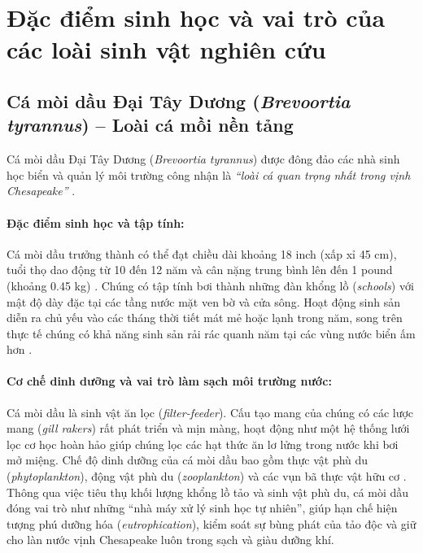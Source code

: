 \section{Đặc điểm sinh học và vai trò của các loài sinh vật nghiên cứu}
\label{sec:intro_species}

\subsection{Cá mòi dầu Đại Tây Dương (\textit{Brevoortia tyrannus}) -- Loài cá mồi nền tảng}

Cá mòi dầu Đại Tây Dương (\textit{Brevoortia tyrannus}) được đông đảo các nhà sinh học biển và quản lý môi trường công nhận là \textit{``loài cá quan trọng nhất trong vịnh Chesapeake''} \cite{cbf2021menhaden}. 

\paragraph{Đặc điểm sinh học và tập tính:}
Cá mòi dầu trưởng thành có thể đạt chiều dài khoảng 18 inch (xấp xỉ 45 cm), tuổi thọ dao động từ 10 đến 12 năm và cân nặng trung bình lên đến 1 pound (khoảng 0.45 kg) \cite{ahrenholz1991population, cbp2021menhaden}. Chúng có tập tính bơi thành những đàn khổng lồ (\textit{schools}) với mật độ dày đặc tại các tầng nước mặt ven bờ và cửa sông. Hoạt động sinh sản diễn ra chủ yếu vào các tháng thời tiết mát mẻ hoặc lạnh trong năm, song trên thực tế chúng có khả năng sinh sản rải rác quanh năm tại các vùng nước biển ấm hơn \cite{ahrenholz1991population, ahrenholz1987population}.

\paragraph{Cơ chế dinh dưỡng và vai trò làm sạch môi trường nước:}
Cá mòi dầu là sinh vật ăn lọc (\textit{filter-feeder}). Cấu tạo mang của chúng có các lược mang (\textit{gill rakers}) rất phát triển và mịn màng, hoạt động như một hệ thống lưới lọc cơ học hoàn hảo giúp chúng lọc các hạt thức ăn lơ lửng trong nước khi bơi mở miệng. Chế độ dinh dưỡng của cá mòi dầu bao gồm thực vật phù du (\textit{phytoplankton}), động vật phù du (\textit{zooplankton}) và các vụn bã thực vật hữu cơ \cite{june1970food}. Thông qua việc tiêu thụ khối lượng khổng lồ tảo và sinh vật phù du, cá mòi dầu đóng vai trò như những ``nhà máy xử lý sinh học tự nhiên'', giúp hạn chế hiện tượng phú dưỡng hóa (\textit{eutrophication}), kiểm soát sự bùng phát của tảo độc và giữ cho làn nước vịnh Chesapeake luôn trong sạch và giàu dưỡng khí.

